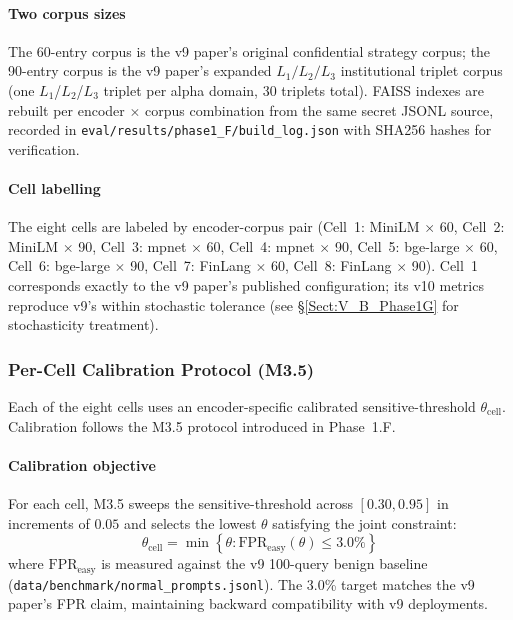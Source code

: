 \documentclass[journal]{IEEEtran}
\begin{document}
\paragraph{Two corpus sizes}
The 60-entry corpus is the v9 paper's original confidential strategy corpus; the 90-entry corpus is the v9 paper's expanded $L_1/L_2/L_3$ institutional triplet corpus (one $L_1$/$L_2$/$L_3$ triplet per alpha domain, 30 triplets total). FAISS indexes are rebuilt per encoder $\times$ corpus combination from the same secret JSONL source, recorded in \texttt{eval/results/phase1\_F/build\_log.json} with SHA256 hashes for verification.

\paragraph{Cell labelling}
The eight cells are labeled by encoder-corpus pair (Cell~1: MiniLM $\times$ 60, Cell~2: MiniLM $\times$ 90, Cell~3: mpnet $\times$ 60, Cell~4: mpnet $\times$ 90, Cell~5: bge-large $\times$ 60, Cell~6: bge-large $\times$ 90, Cell~7: FinLang $\times$ 60, Cell~8: FinLang $\times$ 90). Cell~1 corresponds exactly to the v9 paper's published configuration; its v10 metrics reproduce v9's within stochastic tolerance (see \S\ref{Sect:V_B_Phase1G} for stochasticity treatment).

\subsubsection{Per-Cell Calibration Protocol (M3.5)}
\label{Sect:V_A_3_Calibration}

Each of the eight cells uses an encoder-specific calibrated sensitive-threshold $\theta_{\text{cell}}$. Calibration follows the M3.5 protocol introduced in Phase~1.F.

\paragraph{Calibration objective}
For each cell, M3.5 sweeps the sensitive-threshold across $[0.30, 0.95]$ in increments of $0.05$ and selects the lowest $\theta$ satisfying the joint constraint:
\begin{equation}
\theta_{\text{cell}} = \min \left\{ \theta : \text{FPR}_{\text{easy}}(\theta) \leq 3.0\% \right\}
\label{eq:m35_threshold}
\end{equation}
where $\text{FPR}_{\text{easy}}$ is measured against the v9 100-query benign baseline (\texttt{data/benchmark/normal\_prompts.jsonl}). The 3.0\% target matches the v9 paper's FPR claim, maintaining backward compatibility with v9 deployments.
\end{document}
